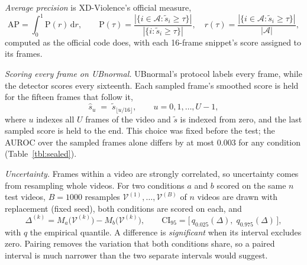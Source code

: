 \documentclass[a4paper,fleqn]{cas-sc}
\begin{document}
\emph{Average precision} is XD-Violence's official measure,
\begin{equation}
\mathrm{AP}=\int_0^1 \mathrm{P}(r)\,\mathrm{d}r,\qquad
\mathrm{P}(\tau)=\frac{|\{i\in\mathcal{A}:\tilde{s}_i\ge\tau\}|}{|\{i:\tilde{s}_i\ge\tau\}|},\quad
r(\tau)=\frac{|\{i\in\mathcal{A}:\tilde{s}_i\ge\tau\}|}{|\mathcal{A}|},
\label{eq:ap2}
\end{equation}
computed as the official code does, with each 16-frame snippet's score assigned to its
frames.

\emph{Scoring every frame on UBnormal.} UBnormal's protocol labels every frame, while the
detector scores every sixteenth. Each sampled frame's smoothed score is held for the
fifteen frames that follow it,
\begin{equation}
\hat{s}_{u} \;=\; \tilde{s}_{\lfloor u/16\rfloor}, \qquad u=0,1,\dots,U-1,
\label{eq:hold}
\end{equation}
where $u$ indexes all $U$ frames of the video and $\tilde{s}$ is indexed from zero, and
the last sampled score is held to the end. This choice was fixed before the test; the
AUROC over the sampled frames alone differs by at most $0.003$ for any condition
(Table~\ref{tbl:sealed}).

\emph{Uncertainty.} Frames within a video are strongly correlated, so uncertainty comes
from resampling whole videos. For two conditions $a$ and $b$ scored on the same $n$ test
videos, $B=1000$ resamples $\mathcal{V}^{(1)},\dots,\mathcal{V}^{(B)}$ of $n$ videos are
drawn with replacement (fixed seed), both conditions are scored on each, and
\begin{equation}
\Delta^{(k)} = M_a\big(\mathcal{V}^{(k)}\big)-M_b\big(\mathcal{V}^{(k)}\big),\qquad
\mathrm{CI}_{95} = \big[\,q_{0.025}(\Delta),\;q_{0.975}(\Delta)\,\big],
\label{eq:boot}
\end{equation}
with $q$ the empirical quantile. A difference is \emph{significant} when its interval
excludes zero. Pairing removes the variation that both conditions share, so a paired
interval is much narrower than the two separate intervals would suggest.
\end{document}
